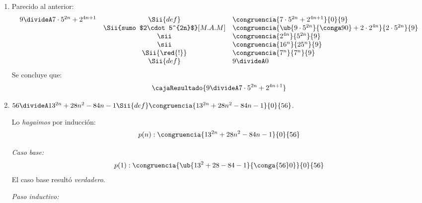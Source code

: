 \begin{enumerate}[label=\alph*)]
  \item Parecido al anterior:
        $$
          \begin{array}{rcl}
            9 \divideA 7 \cdot 5^{2n} + 2^{4n+1}
             & \Sii{def}                         & \congruencia{7\cdot5^{2n} + 2^{4n+1}}{0}{9}                                     \\
             & \Sii{sumo $2\cdot 5^{2n}$}[M.A.M] & \congruencia{\ub{9 \cdot 5^{2n}}{\conga9 0} + 2\cdot 2^{4n}}{2 \cdot 5^{2n}}{9} \\
             & \sii                              & \congruencia{2^{4n}}{5^{2n}}{9}                                                 \\
             & \sii                              & \congruencia{16^n}{25^n}{9}                                                     \\
             & \Sii{\red{!}}                     & \congruencia{7^n}{7^n}{9}                                                       \\
             & \Sii{def}                         & 9 \divideA 0
          \end{array}
        $$
        Se concluye que:
        $$
          \cajaResultado{
            9 \divideA 7 \cdot 5^{2n} + 2^{4n+1}
          }
        $$

  \item $56 \divideA 13^{2n} + 28n^2 - 84n -1
          \Sii{def}
          \congruencia{13^{2n} + 28n^2 - 84n -1}{0}{56}$.

        Lo \textit{hagaimos} por inducción:
        $$
          p(n) : \congruencia{13^{2n} + 28n^2 - 84n -1}{0}{56}
        $$

        \textit{Caso base:}
        $$
          p(1) : \congruencia{\ub{13^2 + 28 - 84 - 1}{\conga{56} 0}}{0}{56}
        $$
        El caso base resultó \textit{verdadero}.

        \medskip

        \textit{Paso inductivo:}


\end{enumerate}
